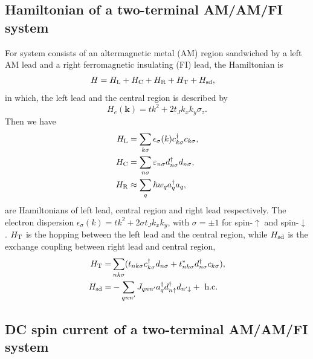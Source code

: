 \documentclass[aps,prb,superscriptaddress]{revtex4-2}
\begin{document}
\subsection{Hamiltonian of a two-terminal AM/AM/FI system}
For system consists of an altermagnetic metal (AM) region sandwiched by a left AM lead and a right ferromagnetic insulating (FI) lead, the Hamiltonian is
\begin{align}
H&=H_{\rm L}+H_{\rm C}+H_{\rm R}+H_{\rm T}+H_{\rm sd},
\end{align}
in which, the left lead and the central region is described by
\begin{equation}\label{eq:He}
H_{e}(\mathbf{k})= tk^2 + 2t_J k_x k_y \sigma_z.
\end{equation}
Then we have
\begin{align}
H_{\rm{L}} &= \sum_{k\sigma} \epsilon_{\sigma}(k) c_{k\sigma}^{\dag} c_{k\sigma},\\
H_{\rm{C}} &= \sum_{n\sigma}\varepsilon_{n\sigma} d_{n\sigma}^{\dagger} d_{n\sigma},\\
H_{\rm{R}} &\approx \sum_{q} \hbar w_{q} a_{q}^{\dagger} a_{q},
\end{align}
are Hamiltonians of left lead, central region and right lead respectively. The electron dispersion $\epsilon_{\sigma}(k)= tk^2+2\sigma t_Jk_xk_y$, with $\sigma=\pm 1$ for spin-$\uparrow$ and spin-$\downarrow$. $H_{\rm T}$ is the hopping between the left lead and the central region, while $H_{\rm sd}$ is the exchange coupling between right lead and central region,
\begin{align}
H_{\rm{T}} =& \sum_{nk\sigma}( t_{nk\sigma} c_{k \sigma}^{\dagger} d_{n\sigma} + t_{nk\sigma}^{*} d_{n\sigma}^{\dagger} c_{k\sigma}),\\
H_{\rm{sd}}=& -\sum_{q n n^{\prime}} J_{q n n^{\prime}} a_q^{\dagger} d_{n \uparrow}^{\dag} d_{n^{\prime} \downarrow} +\text { h.c. }
\end{align}

\subsection{DC spin current of a two-terminal AM/AM/FI system}
\end{document}
